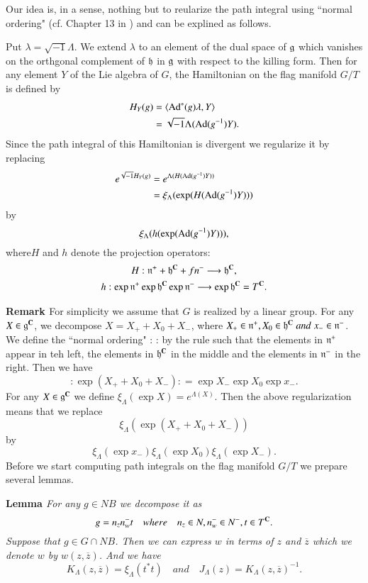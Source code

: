 Our idea is, in a sense, nothing but to reularize the path integral using ``normal ordering" (cf. Chapter 13 in \cite{art15-key10}) and can be explined as follows.

Put $\lambda = \sqrt{-1}\Lambda$. We extend $\lambda$ to an element of the dual space of $\mathfrak{g}$ which vanishes on the orthgonal complement of $\mathfrak{h}$ in $\mathfrak{g}$ with respect to the killing form. Then for any element $Y$ of the Lie algebra of $G$, the Hamiltonian on the flag manifold $G/T$ is defined by
\begin{align*}
H_{Y}(g)&=\langle \operatorname{Ad}^{*}(g)\lambda, Y\rangle\\
&= \sqrt{-1}\Lambda(\operatorname{Ad}(g^{-1})Y).
\end{align*}
Since the path integral of this Hamiltonian is divergent we regularize it by replacing
\begin{align*}
e^{\sqrt{-1}H_{Y}(g)}&= e^{\Lambda(H(\operatorname{Ad}(g^{-1})Y))}\\
& = \xi_{\Lambda}(\exp(H(\operatorname{Ad}(g^{-1})Y)))
\end{align*}
by
$$
\xi_{\Lambda}(h(\exp(\operatorname{Ad}(g^{-1})Y))),
$$
where$H$ and $h$ denote the projection operators:
\begin{gather*}
H : \mathfrak{n}^{+} + \mathfrak{h}^{\mathbf{C}}+ fn^{-}\longrightarrow \mathfrak{h}^{\mathbf{C}},\\
h : \exp \mathfrak{n}^{+} \exp \mathfrak{h}^{\mathbf{C}} \exp \mathfrak{n}^{-} \longrightarrow \exp \mathfrak{h}^{\mathbf{C}} =T^{\mathbf{C}}.
\end{gather*}

\medskip
\noindent
{\bfseries Remark  \label{art15-remark-1}} For simplicity we assume that $G$ is realized by a linear group. For any $X\in \mathfrak{g}^{\mathbf{C}}$, we decompose $X=X_{+}+X_{0}+X_{-}$, where $X_{+}\in \mathfrak{n}^{+}, X_{0} \in \mathfrak{h}^{\mathbf{C}} \;and \; x_{-} \in \mathfrak{n}^{-}$. We define the ``normal ordering" : : by the rule such that the elements in $\mathfrak{n}^{+}$ appear in teh left, the elements in $\mathfrak{h}^{\mathbf{C}}$ in the middle and the elements in $\mathfrak{n}^{-}$ in the right. Then we have
$$
: \exp (X_{+} + X_{0} + X_{-}): =\exp X_{-}\exp X_{0} \exp x_{-}.
$$ 
For any $X \in \mathfrak{g}^{\mathbf{C}}$ we define $\xi_{\Lambda}(\exp X) = e^{\Lambda(X)}$. Then the above regularization means that we replace
$$
\xi_{\Lambda}(\exp(X_{+}+ X_{0}+ X_{-}))
$$
by
$$
\xi_{\Lambda}(\exp x_{-})\xi_{\Lambda}(\exp X_{0})\xi_{\Lambda}(\exp X_{-}).
$$
Before we start computing path integrals on the flag manifold $G/T$ we prepare several lemmas.

\medskip
\noindent
{\bfseries Lemma  \label{art15-lemma-2}} \textit{For any $g \in N B$ we decompose it as}
$$
g =n_{z}n_{w}^{-}t \quad where \quad n_{z} \in N, n_{w}^{-} \in N^{-}, t \in T^{\mathbf{C}}.
$$
\textit{Suppose that $g \in G \cap N B$. Then we can express $w$ in terms of $z$ and $\overline{z}$ which we denote $w$ by $w(z,\overline{z})$. And we have}
$$
K_{\Lambda}(z, \overline{z})= \xi_{\Lambda}(t^{*}t) \quad and \quad J_{\Lambda}(z)=K_{\Lambda}(z, \overline{z})^{-1}.
$$

